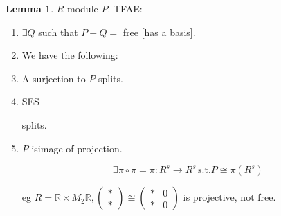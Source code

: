 \documentclass{article}
\theoremstyle{definition}
\newtheorem{lemma}[theorem]{Lemma}
\begin{document}
\begin{lemma}
    \(R\)-module \(P\). TFAE:

    \begin{enumerate}[label=\roman*)]
        \item \(\exists Q\) such that \(P+Q =\) free [has a basis].
        \item We have the following:
        \begin{center}
        \end{center}

        \item A surjection to \(P\) splits.
        
        \begin{center}
        \end{center}

        \item SES
        
        \begin{center}
        \end{center}

        splits.

        \item \(P\) isimage of projection.
        
        \[
            \exists \pi \circ \pi = \pi : R^s \to R^s \, \text{s.t.} P \cong \pi (R^s)
        \]

        eg \(R = \mathbb{R} \times  M_2\mathbb{R}, \begin{pmatrix}
            \ast \\ \ast
        \end{pmatrix} \cong \begin{pmatrix}
            \ast  &  0 \\
            \ast &  0
        \end{pmatrix}\) is projective, not free. 

    \end{enumerate} 

\end{lemma}
\end{document}
